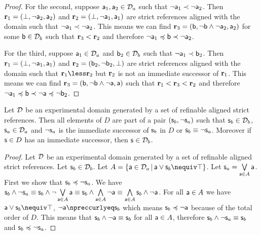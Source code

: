 \documentclass[11pt,letterpaper,fleqn]{memoir} %
\begin{document}
\begin{mathSection}
\begin{proof}
	For the second, suppose $\stmt[a]_1, \stmt[a]_2 \in \edomain_a$ such that $\NOT \stmt[a]_1 \snarrower \NOT \stmt[a]_2$. Then $\refStmt_1 = ( \contradiction, \NOT \stmt[a]_2, \stmt[a]_2 )$ and  $\refStmt_2 = ( \contradiction, \NOT \stmt[a]_1, \stmt[a]_1)$ are strict references aligned with the domain such that $\NOT \stmt[a]_1 \snarrower \NOT \stmt[a]_2$. This means we can find $\refStmt_3 = ( \stmt[b], \NOT \stmt[b] \AND \NOT \stmt[a]_2, \stmt[a]_2 )$ for some $\stmt[b] \in \edomain_b$ such that $\refStmt_3 < \refStmt_2$ and therefore $\NOT \stmt[a]_1 \narrower \stmt[b] \snarrower \NOT \stmt[a]_2$.
	
	For the third, suppose $\stmt[a]_1 \in \edomain_a$ and $\stmt[b]_2\in \edomain_b$ such that $\NOT \stmt[a]_1 \snarrower \stmt[b]_2$. Then $\refStmt_1 = ( \contradiction, \NOT \stmt[a]_1, \stmt[a]_1 )$ and  $\refStmt_2 = ( \stmt[b]_2, \NOT \stmt[b]_2, \contradiction)$ are strict references aligned with the domain such that $\refStmt_1 \less \refStmt_2$ but $\refStmt_2$ is not an immediate successor of $\refStmt_1$. This means we can find $\refStmt_3 = ( \stmt[b], \NOT \stmt[b] \AND \NOT \stmt[a], \stmt[a] )$ such that $\refStmt_1 < \refStmt_3 < \refStmt_2$ and therefore $\NOT \stmt[a]_1 \narrower \stmt[b] \snarrower \NOT \stmt[a] \narrower \NOT \stmt[b]_2$.
\end{proof}

\begin{prop}\label{3_prop_refinable_is_pair_ordering}
	Let $\edomain$ be an experimental domain generated by a set of refinable aligned strict references. Then all elements of $D$ are part of a pair $(\stmt_b, \NOT \stmt_a)$ such that $\stmt_b \in \edomain_b$, $\stmt_a \in \edomain_a$ and $\NOT \stmt_a$ is the immediate successor of $\stmt_b$ in $D$ or $\stmt_b \equiv \NOT \stmt_a$. Moreover if $\stmt \in D$ has an immediate successor, then $\stmt \in \edomain_b$.
\end{prop}
\begin{proof}
	Let $\edomain$ be an experimental domain generated by a set of refinable aligned strict references. Let $\stmt_b \in \edomain_b$. Let $A=\{\stmt[a] \in \edomain_a \, | \, \stmt[a] \OR \stmt_b \nequiv \tautology \}$. Let $\stmt_a=\bigOR\limits_{\stmt[a] \in A} \stmt[a]$. First we show that $\stmt_b \narrower \NOT \stmt_a$. We have $\stmt_b \AND \NOT \stmt_a \equiv \stmt_b \AND \NOT \bigOR\limits_{\stmt[a] \in A} \stmt[a] \equiv \stmt_b \AND \bigAND\limits_{\stmt[a] \in A} \NOT \stmt[a] \equiv \bigAND\limits_{\stmt[a] \in A} \stmt_b \AND \NOT \stmt[a]$. For all $\stmt[a] \in A$ we have $\stmt[a] \OR \stmt_b \nequiv \tautology$, $\NOT \stmt[a] \nnarrower \stmt_b$ which means $\stmt_b \narrower \NOT \stmt[a]$ because of the total order of $D$. This means that $\stmt_b \AND \NOT \stmt[a] \equiv \stmt_b$ for all $\stmt[a] \in A$, therefore $\stmt_b \AND \NOT \stmt_a \equiv \stmt_b$ and $\stmt_b \narrower \NOT \stmt_a$.
	

\end{proof}
\end{mathSection}
\end{document}
